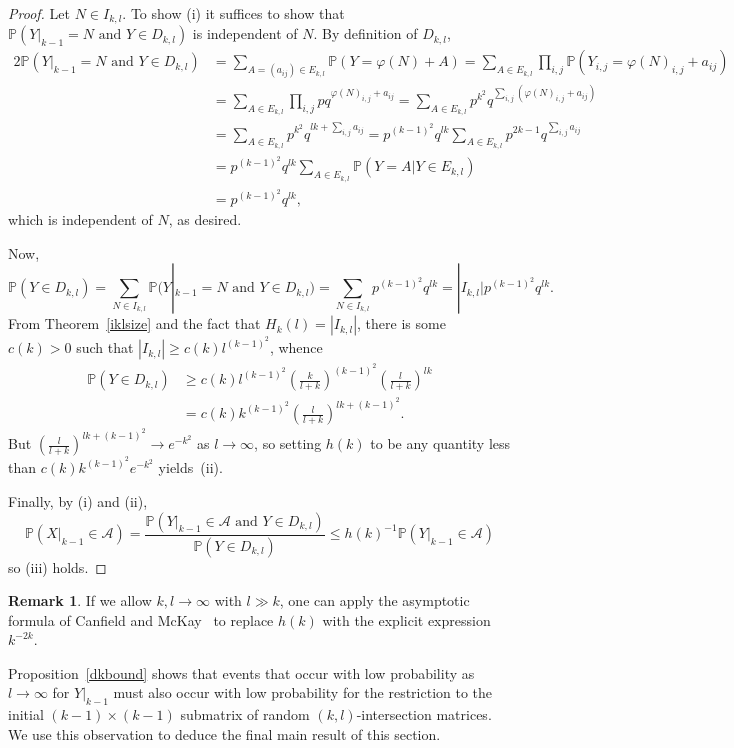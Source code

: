 \documentclass{daj}
\theoremstyle{plain}
\theoremstyle{definition}
\newtheorem{remark}[theorem]{Remark}
\begin{document}
\begin{proof}
Let $N\in I_{k,l}$. To show (i) it suffices to show that $\mathbb{P}(Y|_{k-1}=N\text{ and } Y\in D_{k,l})$ is independent of $N$. By definition of $D_{k,l}$, \begin{alignat*}{2}\mathbb{P}(Y|_{k-1}=N\text{ and } Y\in D_{k,l})&=\sum_{A=(a_{ij})\in E_{k,l}}\mathbb{P}(Y=\varphi(N)+A)
=\sum_{A\in E_{k,l}}\prod_{i,j}\mathbb{P}(Y_{i,j}=\varphi(N)_{i,j}+a_{ij})\\
&=\sum_{A\in E_{k,l}}\prod_{i,j} pq^{\varphi(N)_{i,j}+a_{ij}}
=\sum_{A\in E_{k,l}}p^{k^2}q^{\sum_{i,j}(\varphi(N)_{i,j}+a_{ij})}\\
&=\sum_{A\in E_{k,l}}p^{k^2}q^{lk+\sum_{i,j}a_{ij}}=p^{(k-1)^2}q^{lk}\sum_{A\in E_{k,l}} p^{2k-1}q^{\sum_{i,j}a_{ij}}\\
&=p^{(k-1)^2}q^{lk}\sum_{A\in E_{k,l}} \mathbb{P}(Y=A | Y\in E_{k,l})\\&=p^{(k-1)^2}q^{lk},\end{alignat*} which is independent of $N$, as desired.

Now, $$\mathbb{P}(Y\in D_{k,l})=\sum_{N\in I_{k,l}}\mathbb{P}(Y|_{k-1}=N\text{ and } Y\in D_{k,l})=\sum_{N\in I_{k,l}}p^{(k-1)^2}q^{lk}=|I_{k,l}|p^{(k-1)^2}q^{lk}.$$
From Theorem~\ref{iklsize} and the fact that $H_k(l)=|I_{k,l}|$, there is some $c(k)>0$ such that $|I_{k,l}|\geq c(k)l^{(k-1)^2}$, whence \begin{align*}\mathbb{P}(Y\in D_{k,l})&\geq c(k)l^{(k-1)^2}\left(\frac{k}{l+k}\right)^{(k-1)^2}\left(\frac{l}{l+k}\right)^{lk}\\&=c(k)k^{(k-1)^2}\left(\frac{l}{l+k}\right)^{lk+(k-1)^2}.
\end{align*} But $\left(\frac{l}{l+k}\right)^{lk+(k-1)^2}\to e^{-k^2}$ as $l\to\infty$, so 
setting $h(k)$ to be any quantity less than $c(k)k^{(k-1)^2}e^{-k^2}$ yields~(ii).

Finally, by (i) and (ii), $$\mathbb{P}(X|_{k-1}\in \mathcal{A})=\frac{\mathbb{P}(Y|_{k-1}\in\mathcal{A}\text{ and } Y\in D_{k,l})}{\mathbb{P}(Y\in D_{k,l})}\leq h(k)^{-1}\mathbb{P}(Y|_{k-1}\in\mathcal{A})$$ so (iii) holds.
\end{proof}

\begin{remark}
If we allow $k,l\to\infty$ with $l\gg k$, one can apply the asymptotic formula of Canfield and McKay~\cite[Corollary 1]{cm} to replace $h(k)$ with the explicit expression $k^{-2k}$.
\end{remark}

Proposition~\ref{dkbound} shows that events that occur with low probability as $l\to \infty$ for $Y|_{k-1}$ must also occur with low probability for the restriction to the initial $(k-1)\times (k-1)$ submatrix of random $(k,l)$-intersection matrices. We use this observation to deduce the final main result of this section.
\end{document}
